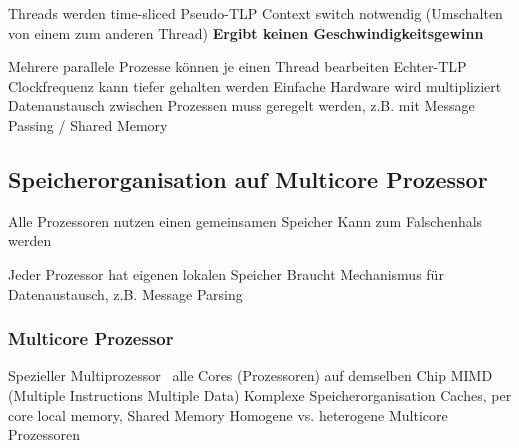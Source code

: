
\begin{outline}
    \1 Threads werden time-sliced
    \1 Pseudo-TLP
    \1 Context switch notwendig (Umschalten von einem zum anderen Thread)
    \1 \textbf{Ergibt keinen Geschwindigkeitsgewinn}
\end{outline}



\begin{outline}
    \1 Mehrere parallele Prozesse können je einen Thread bearbeiten
    \1 Echter-TLP
    \1 Clockfrequenz kann tiefer gehalten werden
    \1 Einfache Hardware wird multipliziert
    \1 Datenaustausch zwischen Prozessen muss geregelt werden, z.B. mit Message Passing / Shared Memory
\end{outline}


\subsection{Speicherorganisation auf Multicore Prozessor}

\begin{minipage}[t]{0.45\columnwidth}
    \raggedright

    \begin{outline}
        \1 Alle Prozessoren nutzen einen gemeinsamen Speicher
            \2 Kann zum Falschenhals werden
    \end{outline}
\end{minipage}
\hfill
\begin{minipage}[t]{0.53\columnwidth}
    \raggedright

    \begin{outline}
        \1 Jeder Prozessor hat eigenen lokalen Speicher
            \2 Braucht Mechanismus für Datenaustausch, z.B. Message Parsing
    \end{outline}
\end{minipage}


\subsubsection{Multicore Prozessor}

\begin{outline}
    \1 Spezieller Multiprozessor \textrightarrow\ alle Cores (Prozessoren) auf demselben Chip
    \1 MIMD (Multiple Instructions Multiple Data)
    \1 Komplexe Speicherorganisation
        \2 Caches, per core local memory, Shared Memory
    \1 Homogene vs. heterogene Multicore Prozessoren
\end{outline}


